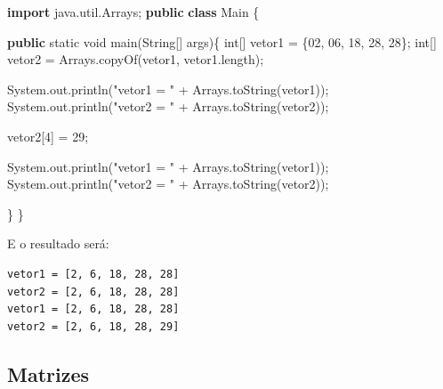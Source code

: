 \documentclass[
]{book}
\newenvironment{Shaded}{\begin{snugshade}}{\end{snugshade}}
\newcommand{\BaseNTok}[1]{\textcolor[rgb]{0.00,0.00,0.81}{#1}}
\newcommand{\BuiltInTok}[1]{#1}
\newcommand{\DataTypeTok}[1]{\textcolor[rgb]{0.13,0.29,0.53}{#1}}
\newcommand{\DecValTok}[1]{\textcolor[rgb]{0.00,0.00,0.81}{#1}}
\newcommand{\FunctionTok}[1]{\textcolor[rgb]{0.00,0.00,0.00}{#1}}
\newcommand{\ImportTok}[1]{#1}
\newcommand{\KeywordTok}[1]{\textcolor[rgb]{0.13,0.29,0.53}{\textbf{#1}}}
\newcommand{\NormalTok}[1]{#1}
\newcommand{\StringTok}[1]{\textcolor[rgb]{0.31,0.60,0.02}{#1}}
\begin{document}
\begin{Shaded}
\begin{Highlighting}[]
\KeywordTok{import}\ImportTok{ java.util.Arrays;}
\KeywordTok{public} \KeywordTok{class}\NormalTok{ Main \{}

    \KeywordTok{public} \DataTypeTok{static} \DataTypeTok{void} \FunctionTok{main}\NormalTok{(}\BuiltInTok{String}\NormalTok{[] args)\{}
        \DataTypeTok{int}\NormalTok{[] vetor1 = \{}\BaseNTok{02}\NormalTok{, }\BaseNTok{06}\NormalTok{, }\DecValTok{18}\NormalTok{, }\DecValTok{28}\NormalTok{, }\DecValTok{28}\NormalTok{\};}
        \DataTypeTok{int}\NormalTok{[] vetor2 = }\BuiltInTok{Arrays}\NormalTok{.}\FunctionTok{copyOf}\NormalTok{(vetor1, vetor1.}\FunctionTok{length}\NormalTok{);}

        \BuiltInTok{System}\NormalTok{.}\FunctionTok{out}\NormalTok{.}\FunctionTok{println}\NormalTok{(}\StringTok{"vetor1 = "}\NormalTok{ + }\BuiltInTok{Arrays}\NormalTok{.}\FunctionTok{toString}\NormalTok{(vetor1));}
        \BuiltInTok{System}\NormalTok{.}\FunctionTok{out}\NormalTok{.}\FunctionTok{println}\NormalTok{(}\StringTok{"vetor2 = "}\NormalTok{ + }\BuiltInTok{Arrays}\NormalTok{.}\FunctionTok{toString}\NormalTok{(vetor2));}

\NormalTok{        vetor2[}\DecValTok{4}\NormalTok{] = }\DecValTok{29}\NormalTok{;}

        \BuiltInTok{System}\NormalTok{.}\FunctionTok{out}\NormalTok{.}\FunctionTok{println}\NormalTok{(}\StringTok{"vetor1 = "}\NormalTok{ + }\BuiltInTok{Arrays}\NormalTok{.}\FunctionTok{toString}\NormalTok{(vetor1));}
        \BuiltInTok{System}\NormalTok{.}\FunctionTok{out}\NormalTok{.}\FunctionTok{println}\NormalTok{(}\StringTok{"vetor2 = "}\NormalTok{ + }\BuiltInTok{Arrays}\NormalTok{.}\FunctionTok{toString}\NormalTok{(vetor2));}
        
\NormalTok{    \}}
\NormalTok{\}}
\end{Highlighting}
\end{Shaded}

E o resultado será:

\begin{verbatim}
vetor1 = [2, 6, 18, 28, 28]
vetor2 = [2, 6, 18, 28, 28]
vetor1 = [2, 6, 18, 28, 28]
vetor2 = [2, 6, 18, 28, 29]
\end{verbatim}

\hypertarget{matrizes}{%
\subsection{Matrizes}\label{matrizes}}
\end{document}

